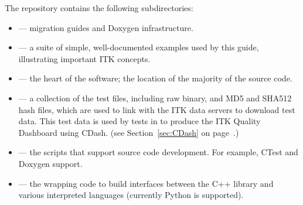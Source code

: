 The  repository contains the following subdirectories:
\begin{itemize}
        \item {} --- migration guides and Doxygen infrastructure.
        \item {} --- a suite of simple, well-documented
        examples used by this guide, illustrating important
        ITK concepts.
        \item {} --- the heart of the software; the location
        of the majority of the source code.
        \item {} --- a collection of the test files, including
        raw binary, and MD5 and SHA512 hash files, which are used to link
        with the ITK data servers to download test data. This test data is
        used by tests in  to produce the ITK Quality
        Dashboard using CDash.
        (see Section~\ref{sec:CDash} on page~\pageref{sec:CDash}.)
        \item {} --- the scripts that support source code
        development. For example, CTest and Doxygen support.
        \item {} --- the wrapping code to build interfaces
        between the C++ library and various interpreted languages (currently
        Python is supported).
\end{itemize}

